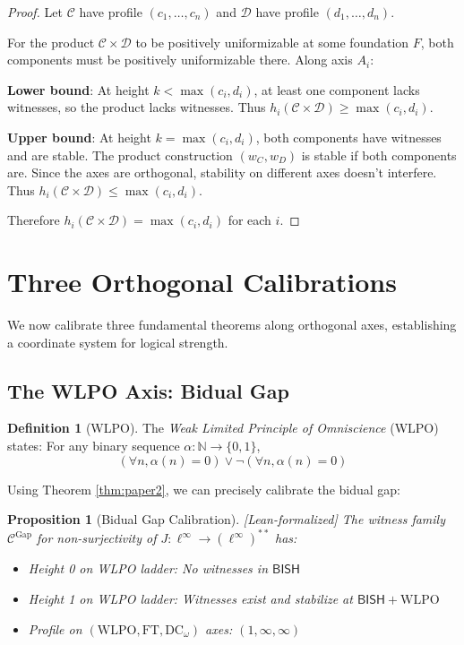 \documentclass[11pt]{article}
\theoremstyle{plain}
\newtheorem{proposition}[theorem]{Proposition}
\theoremstyle{definition}
\newtheorem{definition}[theorem]{Definition}
\newcommand{\N}{\mathbb{N}}
\newcommand{\WLPO}{\mathrm{WLPO}}
\newcommand{\FT}{\mathrm{FT}}
\newcommand{\DCw}{\mathrm{DC}_\omega}
\newcommand{\BISH}{\mathsf{BISH}}
\newcommand{\linf}{\ell^\infty}
\newcommand{\leanok}{\textsf{\textcolor{green!70!black}{[Lean-formalized]}}}
\begin{document}
\begin{proof}
Let $\mathcal{C}$ have profile $(c_1, \ldots, c_n)$ and $\mathcal{D}$ have profile $(d_1, \ldots, d_n)$.

For the product $\mathcal{C} \times \mathcal{D}$ to be positively uniformizable at some foundation $F$, both components must be positively uniformizable there. Along axis $A_i$:

\textbf{Lower bound}: At height $k < \max(c_i, d_i)$, at least one component lacks witnesses, so the product lacks witnesses. Thus $h_i(\mathcal{C} \times \mathcal{D}) \geq \max(c_i, d_i)$.

\textbf{Upper bound}: At height $k = \max(c_i, d_i)$, both components have witnesses and are stable. The product construction $(w_C, w_D)$ is stable if both components are. Since the axes are orthogonal, stability on different axes doesn't interfere. Thus $h_i(\mathcal{C} \times \mathcal{D}) \leq \max(c_i, d_i)$.

Therefore $h_i(\mathcal{C} \times \mathcal{D}) = \max(c_i, d_i)$ for each $i$.
\end{proof}

\section{Three Orthogonal Calibrations}

We now calibrate three fundamental theorems along orthogonal axes, establishing a coordinate system for logical strength.

\subsection{The WLPO Axis: Bidual Gap}

\begin{definition}[WLPO]\label{def:wlpo}
The \emph{Weak Limited Principle of Omniscience} (WLPO) states: For any binary sequence $\alpha: \N \to \{0,1\}$,
\[
(\forall n, \alpha(n) = 0) \vee \neg(\forall n, \alpha(n) = 0)
\]
\end{definition}

Using Theorem \ref{thm:paper2}, we can precisely calibrate the bidual gap:

\begin{proposition}[Bidual Gap Calibration]\label{prop:gap-height} \leanok
The witness family $\mathcal{C}^{\text{Gap}}$ for non-surjectivity of $J: \linf \to (\linf)^{**}$ has:
\begin{itemize}
\item Height 0 on WLPO ladder: No witnesses in $\BISH$
\item Height 1 on WLPO ladder: Witnesses exist and stabilize at $\BISH + \WLPO$
\item Profile on $(\WLPO, \FT, \DCw)$ axes: $(1, \infty, \infty)$
\end{itemize}
\end{proposition}
\end{document}
